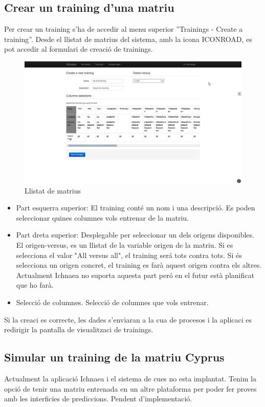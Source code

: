\begin{itemize}
\section{Crear un training d'una matriu}
Per crear un training s'ha de accedir al menu superior ''Trainings - Create a training''. Desde el llistat de matrius del sistema, amb la icona ICONROAD, es pot accedir al formulari de creaci\'{o} de trainings.
\begin{figure}[h!]
  \centering
  \includegraphics[scale=0.2]{img/userguide/training_create.png}
  \caption{Llistat de matrius}
  \label{fig:placement}
\end{figure}
\begin{itemize}
\item Part esquerra superior: El training cont\'{e} un nom i una descripci\'{o}. Es poden seleccionar quines columnes vols entrenar de la matriu. 
\item Part dreta superior: Desplegable per seleccionar un dels origens disponibles.  El origen-versus, es un llistat de la variable origen de la matriu. Si es selecciona el valor "All versus all", el training ser\'{a} tots contra tots. Si \'{e}s selecciona un origen concret, el training es far\`{a} aquest origen contra els altres. Actualment Ichnaea no suporta aquesta part per\'{o} en el futur est\`{a} planificat que ho far\`{a}.
\item Selecci\'{o} de columnes. Selecci\'{o} de columnes que vols entrenar.
\end{itemize}

Si la creaci \´e{s} correcte, les dades s'enviaran a la cua de procesos i la aplicaci es redirigir la pantalla de visualitzaci de trainings.

\subsection{Simular un training de la matriu Cyprus}
Actualment la aplicaci\'{o} Ichnaea i el sistema de cues no esta implantat. Tenim la opci\'{o} de tenir una matriu entrenada en un altre plataforma per poder fer proves amb les interficies de prediccions. Pendent d'implementaci\'{o}.


\end{itemize}
